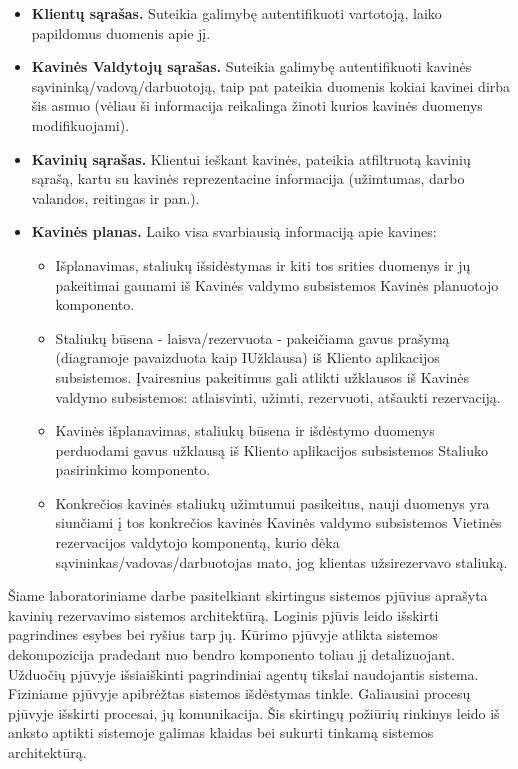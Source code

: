 \documentclass{VUMIFPSkursinis}
\begin{document}
\begin{itemize}
  \item \textbf{Klientų sąrašas.} Suteikia galimybę autentifikuoti vartotoją, laiko papildomus duomenis apie jį.
  \item \textbf{Kavinės Valdytojų sąrašas.} Suteikia galimybę autentifikuoti kavinės sąvininką/vadovą/darbuotoją, taip pat pateikia duomenis kokiai kavinei dirba šis asmuo (vėliau ši informacija reikalinga žinoti kurios kavinės duomenys modifikuojami).
  \item \textbf{Kavinių sąrašas.} Klientui ieškant kavinės, pateikia atfiltruotą kavinių sąrašą, kartu su kavinės reprezentacine informacija (užimtumas, darbo valandos, reitingas ir pan.).
  \item \textbf{Kavinės planas.} Laiko visa svarbiausią informaciją apie kavines:
  	\begin{itemize}
  	\item Išplanavimas, staliukų išsidėstymas ir kiti tos srities duomenys ir jų pakeitimai gaunami iš Kavinės valdymo subsistemos Kavinės planuotojo komponento.
  	\item Staliukų būsena - laisva/rezervuota - pakeičiama gavus prašymą (diagramoje pavaizduota kaip IUžklausa) iš Kliento aplikacijos subsistemos. Įvairesnius pakeitimus gali atlikti užklausos iš Kavinės valdymo subsistemos: atlaisvinti, užimti, rezervuoti, atšaukti rezervaciją.
  	\item Kavinės išplanavimas, staliukų būsena ir išdėstymo duomenys perduodami gavus užklausą iš Kliento aplikacijos subsistemos Staliuko pasirinkimo komponento.
  	\item Konkrečios kavinės staliukų užimtumui pasikeitus, nauji duomenys yra siunčiami į tos konkrečios kavinės Kavinės valdymo subsistemos Vietinės rezervacijos valdytojo komponentą, kurio dėka sąvininkas/vadovas/darbuotojas mato, jog klientas užsirezervavo staliuką.
  	\end{itemize}
\end{itemize}


Šiame laboratoriniame darbe pasitelkiant skirtingus sistemos pjūvius aprašyta kavinių rezervavimo sistemos architektūrą. Loginis pjūvis leido išskirti pagrindines esybes bei ryšius tarp jų. Kūrimo pjūvyje atlikta sistemos dekompozicija pradedant nuo bendro komponento toliau jį detalizuojant. Užduočių pjūvyje išsiaiškinti pagrindiniai agentų tikslai naudojantis sistema. Fiziniame pjūvyje apibrėžtas sistemos išdėstymas tinkle.  Galiausiai procesų pjūvyje išskirti procesai, jų komunikacija. Šis skirtingų požiūrių rinkinys leido iš anksto aptikti sistemoje galimas klaidas bei sukurti tinkamą sistemos architektūrą.
\end{document}
